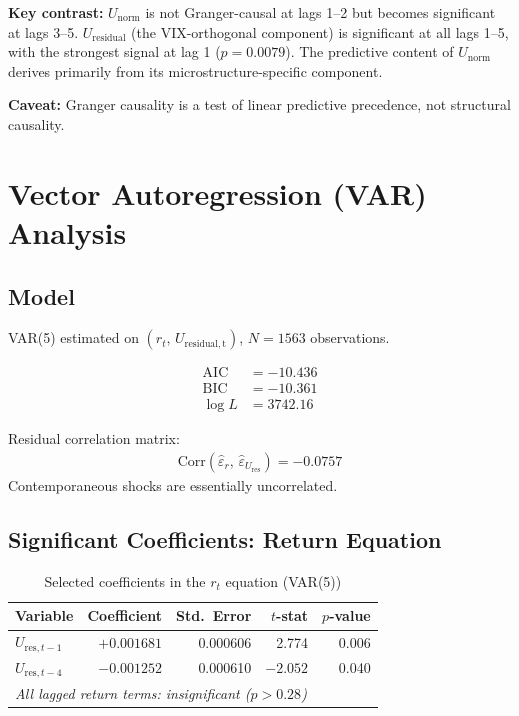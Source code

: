 \documentclass[preprint,12pt]{elsarticle}
\begin{document}
\textbf{Key contrast:} $U_\mathrm{norm}$ is not Granger-causal at lags 1--2 but becomes significant at lags 3--5. $U_\mathrm{residual}$ (the VIX-orthogonal component) is significant at all lags 1--5, with the strongest signal at lag 1 ($p = 0.0079$). The predictive content of $U_\mathrm{norm}$ derives primarily from its microstructure-specific component.

\textbf{Caveat:} Granger causality is a test of linear predictive precedence, not structural causality.

\section{Vector Autoregression (VAR) Analysis}

\subsection{Model}

VAR(5) estimated on $(r_t,\, U_\mathrm{residual,t})$, $N = 1563$ observations.

\begin{align}
    \mathrm{AIC} &= -10.436 \\
    \mathrm{BIC} &= -10.361 \\
    \log L &= 3742.16
\end{align}

Residual correlation matrix:
\begin{align}
    \mathrm{Corr}(\hat{\varepsilon}_{r},\, \hat{\varepsilon}_{U_\mathrm{res}}) = -0.0757
\end{align}
Contemporaneous shocks are essentially uncorrelated.

\subsection{Significant Coefficients: Return Equation}

\begin{table}[htbp]
\centering
\caption{Selected coefficients in the $r_t$ equation (VAR(5))}
\begin{tabular}{lrrrr}
\toprule
Variable & Coefficient & Std.\ Error & $t$-stat & $p$-value \\
\midrule
$U_{\mathrm{res}, t-1}$ & $+0.001681$ & 0.000606 & 2.774 & 0.006 \\
$U_{\mathrm{res}, t-4}$ & $-0.001252$ & 0.000610 & $-2.052$ & 0.040 \\
\midrule
\multicolumn{5}{l}{\textit{All lagged return terms: insignificant ($p > 0.28$)}} \\
\bottomrule
\end{tabular}
\end{table}
\end{document}
